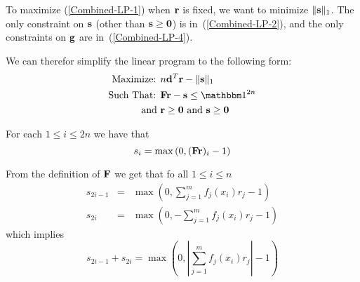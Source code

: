 \documentclass{article}[12pt]
\begin{document}
To maximize (\ref{Combined-LP-1}) when $\mathbf{r}$ is fixed, we want to
minimize $\|\mathbf{s}\|_1$. The only constraint on $\mathbf{s}$ (other than $\mathbf{s}
\geq \mathbf{0}$) is in~(\ref{Combined-LP-2}), and the only constraints on
$\mathbf{g}$ are in~(\ref{Combined-LP-4}).

We can therefor simplify the linear program to the following form:
\begin{eqnarray}
\mbox{Maximize: }& n \vd^T \vr  - \| \vs \|_1 \label{condensed-LP-1}\\
\mbox{Such That: }& \vF \vr  - \vs \leq \ones{2n}  \label{Condensed-LP-2}\\
\mbox{ and } & \vr \geq \vzero \mbox{ and } \vs \geq \vzero \label{Condensed-LP-3} \\
\end{eqnarray}

For each $1 \leq i \leq 2n$ we have that
\[
s_i = \max \left(0,(\mathbf{F} \mathbf{r})_i -1 \right)
\]

From the definition of $\mathbf{F}$ we get that fo all $1 \leq i \leq n$
\begin{eqnarray*}
s_{2i-1} &=& \max \left(0,\sum_{j=1}^m f_j(x_i) r_j -1 \right) \\
s_{2i} &=& \max \left(0,-\sum_{j=1}^m f_j(x_i) r_j -1 \right)
\end{eqnarray*}
which implies 
\[
s_{2i-1}+s_{2i} = \max \left(0,\left| \sum_{j=1}^m f_j(x_i) r_j \right| -1 \right)
\]
\end{document}
